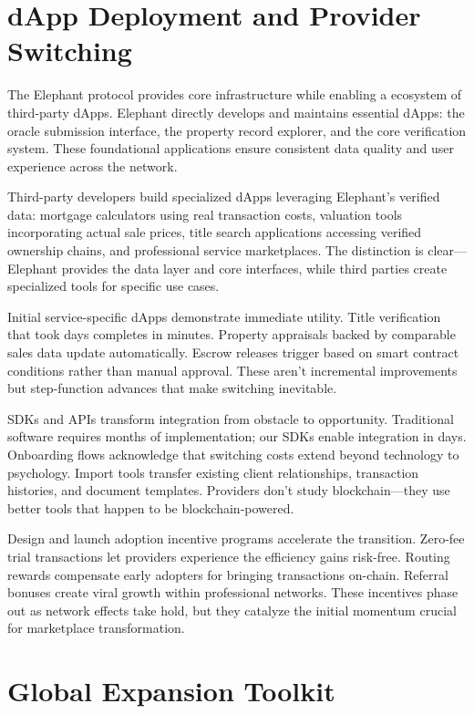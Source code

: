 \section{dApp Deployment and Provider Switching}

The Elephant protocol provides core infrastructure while enabling a ecosystem of third-party dApps. Elephant directly develops and maintains essential dApps: the oracle submission interface, the property record explorer, and the core verification system. These foundational applications ensure consistent data quality and user experience across the network.

Third-party developers build specialized dApps leveraging Elephant's verified data: mortgage calculators using real transaction costs, valuation tools incorporating actual sale prices, title search applications accessing verified ownership chains, and professional service marketplaces. The distinction is clear—Elephant provides the data layer and core interfaces, while third parties create specialized tools for specific use cases.

Initial service-specific dApps demonstrate immediate utility. Title verification that took days completes in minutes. Property appraisals backed by comparable sales data update automatically. Escrow releases trigger based on smart contract conditions rather than manual approval. These aren't incremental improvements but step-function advances that make switching inevitable.

SDKs and APIs transform integration from obstacle to opportunity. Traditional software requires months of implementation; our SDKs enable integration in days. Onboarding flows acknowledge that switching costs extend beyond technology to psychology. Import tools transfer existing client relationships, transaction histories, and document templates. Providers don't study blockchain—they use better tools that happen to be blockchain-powered.

Design and launch adoption incentive programs accelerate the transition. Zero-fee trial transactions let providers experience the efficiency gains risk-free. Routing rewards compensate early adopters for bringing transactions on-chain. Referral bonuses create viral growth within professional networks. These incentives phase out as network effects take hold, but they catalyze the initial momentum crucial for marketplace transformation.

\section{Global Expansion Toolkit}

